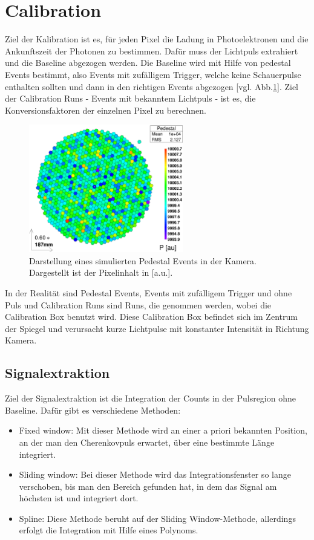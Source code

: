 \section{Calibration}
\label{sec:Calibration}
Ziel der Kalibration ist es, für jeden Pixel die Ladung in Photoelektronen und die Ankunftszeit der Photonen zu bestimmen.
Dafür muss der Lichtpuls extrahiert und die Baseline abgezogen werden.
Die Baseline wird mit Hilfe von pedestal Events bestimmt, also Events mit zufälligem Trigger, welche keine Schauerpulse enthalten sollten und dann in den richtigen Events abgezogen [vgl. Abb.\ref{Kamera-Bild-Pedestal}].
Ziel der Calibration Runs - Events mit bekanntem Lichtpuls - ist es, die Konversionsfaktoren der einzelnen Pixel zu berechnen.

\begin{figure}
    \centering
    \includegraphics[width=0.6\textwidth]{./Plots/03_MonteCarlos/Pedestal_fertig.png}
    \caption{Darstellung eines simulierten Pedestal Events in der Kamera. Dargestellt ist der Pixelinhalt in [a.u.].}
    \label{Kamera-Bild-Pedestal}
\end{figure}

In der Realität sind Pedestal Events, Events mit zufälligem Trigger und ohne Puls und Calibration Runs sind Runs, die genommen werden, wobei die Calibration Box benutzt wird.
Diese Calibration Box befindet sich im Zentrum der Spiegel und verursacht kurze Lichtpulse mit konstanter Intensität in Richtung Kamera.


\subsection{Signalextraktion}
Ziel der Signalextraktion ist die Integration der Counts in der Pulsregion ohne Baseline.
Dafür gibt es verschiedene Methoden:
\begin{itemize}
 \item Fixed window: Mit dieser Methode wird an einer a priori bekannten Position, an der man den Cherenkovpuls erwartet, über eine bestimmte Länge integriert.
 \item Sliding window: Bei dieser Methode wird das Integrationsfenster so lange verschoben, bis man den Bereich gefunden hat, in dem das Signal am höchsten ist und integriert dort.
 \item Spline: Diese Methode beruht auf der Sliding Window-Methode, allerdings erfolgt die Integration mit Hilfe eines Polynoms.
\end{itemize}

